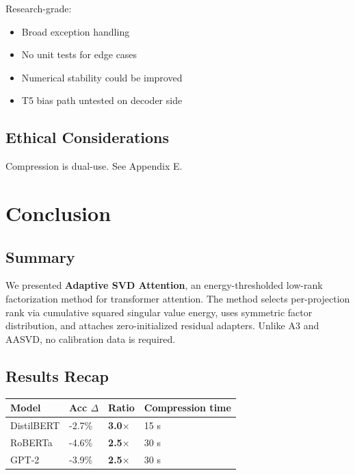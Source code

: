 Research-grade:
\begin{itemize}
\item Broad exception handling
\item No unit tests for edge cases
\item Numerical stability could be improved
\item T5 bias path untested on decoder side

\end{itemize}
\subsection{Ethical Considerations}

Compression is dual-use. See Appendix E.


\section{Conclusion}

\subsection{Summary}

We presented \textbf{Adaptive SVD Attention}, an energy-thresholded low-rank 
factorization method for transformer attention. The method selects per-projection 
rank via cumulative squared singular value energy, uses symmetric factor 
distribution, and attaches zero-initialized residual adapters. Unlike A3 and 
AASVD, no calibration data is required.

\subsection{Results Recap}

\begin{table}[H]
\centering
\small
\begin{tabular}{llll}
\toprule
\textbf{Model} & \textbf{Acc $\Delta$} & \textbf{Ratio} & \textbf{Compression time} \\
\midrule
DistilBERT & -2.7\% & \textbf{3.0$\times$} & 15 s \\
RoBERTa & -4.6\% & \textbf{2.5$\times$} & 30 s \\
GPT-2 & -3.9\% & \textbf{2.5$\times$} & 30 s \\
\bottomrule
\end{tabular}
\end{table}

